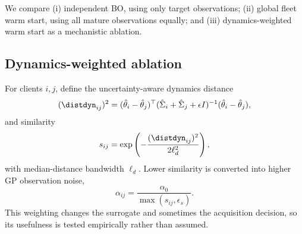 We compare (i) independent BO, using only target observations; (ii) global fleet warm start, using all mature observations equally; and (iii) dynamics-weighted warm start as a mechanistic ablation.

\subsection{Dynamics-weighted ablation}
For clients $i,j$, define the uncertainty-aware dynamics distance
\begin{equation}
(\distdyn_{ij})^2=(\hat\theta_i-\hat\theta_j)^\top(\hat\Sigma_i+\hat\Sigma_j+\epsilon I)^{-1}(\hat\theta_i-\hat\theta_j),
\end{equation}
and similarity
\begin{equation}
 s_{ij}=\exp\left(-\frac{(\distdyn_{ij})^2}{2\ell_d^2}\right),
\end{equation}
with median-distance bandwidth $\ell_d$. Lower similarity is converted into higher GP observation noise,
\begin{equation}
 \alpha_{ij}=\frac{\alpha_0}{\max(s_{ij},\epsilon_s)}.
\end{equation}
This weighting changes the surrogate and sometimes the acquisition decision, so its usefulness is tested empirically rather than assumed.


